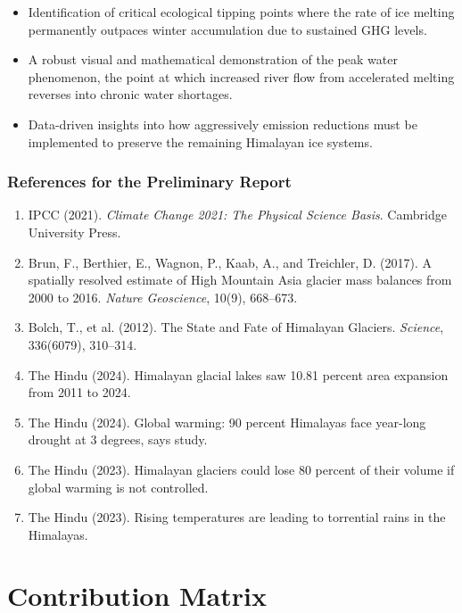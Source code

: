 \documentclass[12pt, a4paper]{article}
\begin{document}
\begin{itemize}
    \item Identification of critical ecological tipping points where the rate of ice melting permanently outpaces winter accumulation due to sustained GHG levels.
    \item A robust visual and mathematical demonstration of the peak water phenomenon, the point at which increased river flow from accelerated melting reverses into chronic water shortages.
    \item Data-driven insights into how aggressively emission reductions must be implemented to preserve the remaining Himalayan ice systems.
\end{itemize}

\subsubsection*{References for the Preliminary Report}

\begin{enumerate}
    \item IPCC (2021). \textit{Climate Change 2021: The Physical Science Basis}. Cambridge University Press.
    \item Brun, F., Berthier, E., Wagnon, P., Kaab, A., and Treichler, D. (2017). A spatially resolved estimate of High Mountain Asia glacier mass balances from 2000 to 2016. \textit{Nature Geoscience}, 10(9), 668--673.
    \item Bolch, T., et al. (2012). The State and Fate of Himalayan Glaciers. \textit{Science}, 336(6079), 310--314.
    \item The Hindu (2024). Himalayan glacial lakes saw 10.81 percent area expansion from 2011 to 2024.
    \item The Hindu (2024). Global warming: 90 percent Himalayas face year-long drought at 3 degrees, says study.
    \item The Hindu (2023). Himalayan glaciers could lose 80 percent of their volume if global warming is not controlled.
    \item The Hindu (2023). Rising temperatures are leading to torrential rains in the Himalayas.
\end{enumerate}

\section{Contribution Matrix}
\end{document}

